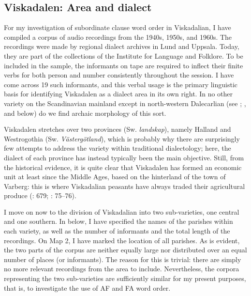 \documentclass[output=paper,colorlinks,citecolor=brown,draft,draftmode]{langscibook}
\begin{document}
\subsection{Viskadalen: Area and dialect}\label{sec:petzell:2.1}


For my investigation of subordinate clause word order in Viskadalian, I have compiled a corpus of audio recordings from the 1940s, 1950s, and 1960s. The recordings were made by regional dialect archives in Lund and Uppsala. Today, they are part of the collections of the Institute for Language and Folklore. To be included in the sample, the informants on tape are required to inflect their finite verbs for both person and number consistently throughout the session. I have come across 19 such informants, and this verbal usage is the primary linguistic basis for identifying Viskadalen as a dialect area in its own right. In no other variety on the Scandinavian mainland except in north-western Dalecarlian (see \citealt{Levander1928}; \citealt{Garbacz2010}, and  below) do we find archaic morphology of this sort.



Viskadalen stretches over two provinces (Sw. \textit{landskap}), namely Halland and Westrogothia (Sw. \textit{Västergötland}), which is probably why there are surprisingly few attempts to address the variety within traditional dialectology; here, the dialect of each province has instead typically been the main objective. Still, from the historical evidence, it is quite clear that Viskadalen has formed an economic unit at least since the Middle Ages, based on the hinterland of the town of Varberg: this is where Viskadalian peasants have always traded their agricultural produce (\citealt{Grill1954}: 679; \citealt{Linge1969}: 75–76).



I move on now to the division of Viskadalian into two sub-varieties, one central and one southern. In  below, I have specified the names of the parishes within each variety, as well as the number of informants and the total length of the recordings. On Map 2, I have marked the location of all parishes. As is evident, the two parts of the corpus are neither equally large nor distributed over an equal number of places (or informants). The reason for this is trivial: there are simply no more relevant recordings from the area to include. Nevertheless, the corpora representing the two sub-varieties are sufficiently similar for my present purposes, that is, to investigate the use of AF and FA word order.
\end{document}
